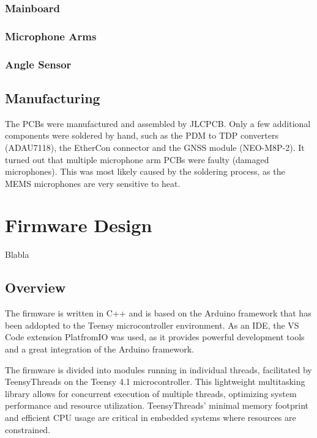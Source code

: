 \subsubsection{Mainboard}

\subsubsection{Microphone Arms}

\subsubsection{Angle Sensor}

\subsection{Manufacturing}
The PCBs were manufactured and assembled by JLCPCB.
Only a few additional components were soldered by hand, such as the PDM to TDP converters (ADAU7118), the EtherCon connector and the GNSS module (NEO-M8P-2).
It turned out that multiple microphone arm PCBs were faulty (damaged microphones).
This was most likely caused by the soldering process, as the MEMS microphones are very sensitive to heat.

\newpage
\section{Firmware Design}
Blabla

\subsection{Overview}
The firmware is written in C++ and is based on the Arduino framework that has been addopted to the Teensy microcontroller environment.
As an IDE, the VS Code extension PlatfromIO was used, as it provides powerful development tools and a great integration of the Arduino framework.

The firmware is divided into modules running in individual threads, facilitated by TeensyThreads on the Teensy 4.1 microcontroller.
This lightweight multitasking library allows for concurrent execution of multiple threads, optimizing system performance and resource utilization.
TeensyThreads' minimal memory footprint and efficient CPU usage are critical in embedded systems where resources are constrained.


